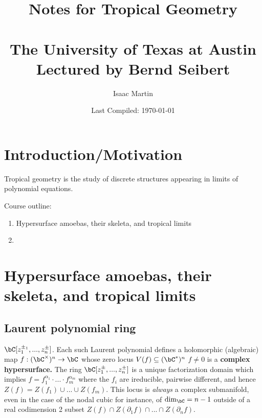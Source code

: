 
\usepackage{indentfirst}

\title{Notes for Tropical Geometry\\ \vspace{0.5em}{\Large Fall 2022}\vspace{0.5em}\\ The University of Texas at Austin \\ Lectured by Bernd Seibert}
\date{Last Compiled: \today}
\author{Isaac Martin}


\pagestyle{empty}
\maketitle
\newpage
\tableofcontents
\newpage
{}

\section{Introduction/Motivation} Tropical geometry is the study of discrete structures appearing in limits of polynomial equations.

Course outline:
\begin{enumerate}[(1)]
  \item Hypersurface amoebas, their skeleta, and tropical limits
  \item 
\end{enumerate}

\section{Hypersurface amoebas, their skeleta, and tropical limits}
\subsection{Laurent polynomial ring}

$\bC[z^{\pm_1}_1,...,z_n^{\pm}]$. Each such Laurent polynomial defines a holomorphic (algebraic) map $f:(\bC^\times)^n \to \bC$ whose zero locus $V(f) \subseteq (\bC^*)^n$ $f \neq 0$ is a \textbf{complex hypersurface.} The ring $\bC[z_1^{\pm},...,z_n^{\pm}]$ is a unique factorization domain which implies $f = f_1^{\alpha_1}\cdot...\cdot f_m^{\alpha_m}$ where the $f_i$ are ireducible, pairwise different, and hence $Z(f) = Z(f_1) \cup ... \cup Z(f_m)$. This locus is \emph{always} a complex submanifold, even in the case of the nodal cubic for instance, of $\dim_\bC = n - 1$ outside of a real codimension 2 subset $Z(f) \cap Z(\partial_1 f) \cap ... \cap Z(\partial_n f)$.

